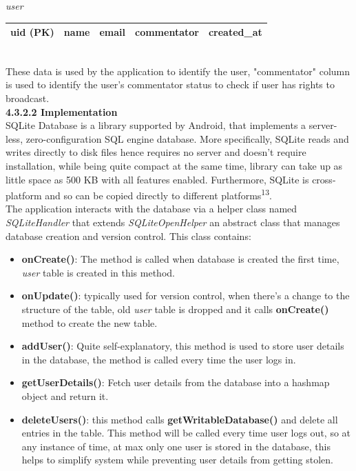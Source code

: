 \documentclass{article}
\begin{document}
\begin{flushleft}
\textit{user}\\
\begin{tabular}{| c | c | c | c | c |}
\hline
uid (PK) & name & email & commentator & created\_at\\
\hline
\end{tabular}\\
These data is used by the application to identify the user, "commentator" column is used to identify the user's commentator status to check if user has rights to broadcast.\\
{\textbf {4.3.2.2 Implementation}}\\
SQLite Database is a library supported by Android, that implements a server-less, zero-configuration SQL engine database. More specifically, SQLite reads and writes directly to disk files hence requires no server and doesn't require installation, while being quite compact at the same time, library can take up as little space as 500 KB with all features enabled. Furthermore, SQLite is cross-platform and so can be copied directly to different platforms\textsuperscript{13}.\\
The application interacts with the database via a helper class named \textit{SQLiteHandler} that extends \textit{SQLiteOpenHelper} an abstract class that manages database creation and version control. This class contains:
\begin{itemize}
	\item \textbf{onCreate()}: The method is called when database is created the first time, \textit{user} table is created in this method.\\
	\item \textbf{onUpdate()}: typically used for version control, when there's a change to the structure of the table, old \textit{user} table is dropped and it calls \textbf{onCreate()} method to create the new table.\\
	\item \textbf{addUser()}: Quite self-explanatory, this method is used to store user details in the database, the method is called every time the user logs in.\\
	\item \textbf{getUserDetails()}: Fetch user details from the database into a hashmap object and return it.
	\item \textbf{deleteUsers()}: this method calls \textbf{getWritableDatabase()} and delete all entries in the table. This method will be called every time user logs out, so at any instance of time, at max only one user is stored in the database, this helps to simplify system while preventing user details from getting stolen.\\

\end{itemize}
\end{flushleft}
\end{document}
